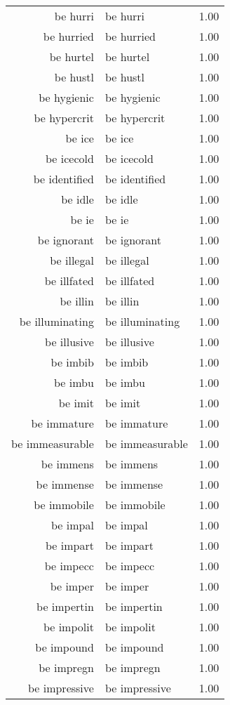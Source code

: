 \begin{table}[ht]
\begin{tabular}{rlr}
  be hurri & be hurri & 1.00 \\ 
  be hurried & be hurried & 1.00 \\ 
  be hurtel & be hurtel & 1.00 \\ 
  be hustl & be hustl & 1.00 \\ 
  be hygienic & be hygienic & 1.00 \\ 
  be hypercrit & be hypercrit & 1.00 \\ 
  be ice & be ice & 1.00 \\ 
  be icecold & be icecold & 1.00 \\ 
  be identified & be identified & 1.00 \\ 
  be idle & be idle & 1.00 \\ 
  be ie & be ie & 1.00 \\ 
  be ignorant & be ignorant & 1.00 \\ 
  be illegal & be illegal & 1.00 \\ 
  be illfated & be illfated & 1.00 \\ 
  be illin & be illin & 1.00 \\ 
  be illuminating & be illuminating & 1.00 \\ 
  be illusive & be illusive & 1.00 \\ 
  be imbib & be imbib & 1.00 \\ 
  be imbu & be imbu & 1.00 \\ 
  be imit & be imit & 1.00 \\ 
  be immature & be immature & 1.00 \\ 
  be immeasurable & be immeasurable & 1.00 \\ 
  be immens & be immens & 1.00 \\ 
  be immense & be immense & 1.00 \\ 
  be immobile & be immobile & 1.00 \\ 
  be impal & be impal & 1.00 \\ 
  be impart & be impart & 1.00 \\ 
  be impecc & be impecc & 1.00 \\ 
  be imper & be imper & 1.00 \\ 
  be impertin & be impertin & 1.00 \\ 
  be impolit & be impolit & 1.00 \\ 
  be impound & be impound & 1.00 \\ 
  be impregn & be impregn & 1.00 \\ 
  be impressive & be impressive & 1.00 \\ 

\end{tabular}
\end{table}
